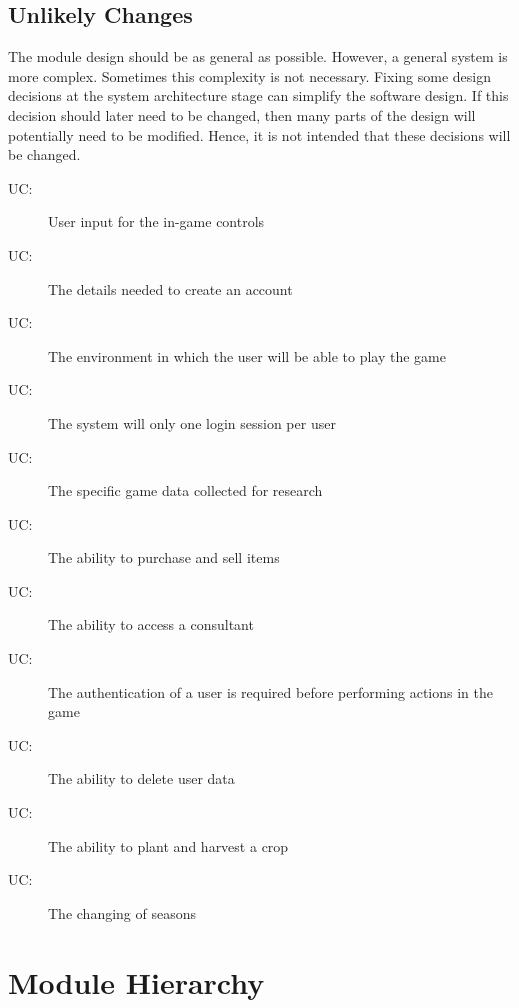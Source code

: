 \documentclass[12pt, titlepage]{article}
\newcounter{ucnum}
\newcommand{\uctheucnum}{UC\theucnum}
\begin{document}
\subsection{Unlikely Changes} \label{SecUchange}

The module design should be as general as possible. However, a general system is
more complex. Sometimes this complexity is not necessary. Fixing some design
decisions at the system architecture stage can simplify the software design. If
this decision should later need to be changed, then many parts of the design
will potentially need to be modified. Hence, it is not intended that these
decisions will be changed.

\begin{description}
\item[ \uctheucnum \label{ucIO}:] User input for the in-game controls
\item [ \uctheucnum \label{ucIO}:] The details needed to create an account
\item [ \uctheucnum \label{ucIO}:] The environment in which the user will be able to play the game
\item [ \uctheucnum \label{ucIO}:] The system will only one login session per user
\item [ \uctheucnum \label{ucIO}:] The specific game data collected for research
\item [ \uctheucnum \label{ucIO}:] The ability to purchase and sell items
\item [ \uctheucnum \label{ucIO}:] The ability to access a consultant 
\item [ \uctheucnum \label{ucIO}:] The authentication of a user is required before performing actions in the game 
\item [ \uctheucnum \label{ucIO}:] The ability to delete user data
\item [ \uctheucnum \label{ucIO}:] The ability to plant and harvest a crop
\item [ \uctheucnum \label{ucIO}:] The changing of seasons


\end{description}

\section{Module Hierarchy} \label{SecMH}
\end{document}
